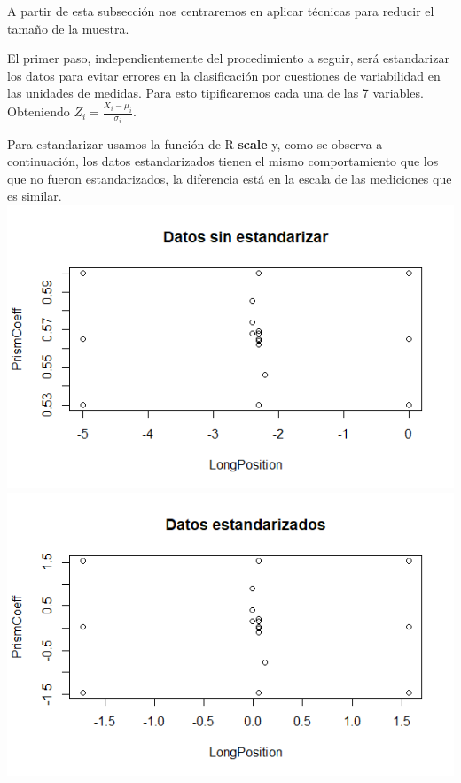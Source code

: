 \documentclass[twoside]{article}
\begin{document}
\begin{multicols}{2}
A partir de esta subsecci\'on nos centraremos en aplicar t\'ecnicas para reducir el tama\~no de la muestra.

El primer paso, independientemente del procedimiento a seguir, ser\'a estandarizar los datos para evitar errores en la clasificaci\'on por cuestiones de variabilidad en las unidades de medidas. Para esto tipificaremos cada una de las 7 variables. Obteniendo
$Z_i = \frac{X_i - \mu_i}{\sigma_i}$.

Para estandarizar usamos la funci\'on de R \textbf{scale} y, como se observa a continuaci\'on, los datos estandarizados tienen el mismo comportamiento que los que no fueron estandarizados, la diferencia est\'a en la escala de las mediciones que es similar.\\

\includegraphics[scale = 0.4]{images/pic_27.png} \\
\includegraphics[scale = 0.4]{images/pic_28.png} \\


\end{multicols}
\end{document}
